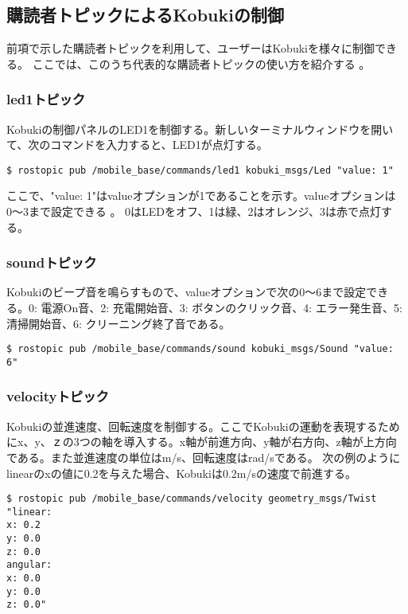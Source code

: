 \subsection{購読者トピックによるKobukiの制御}

前項で示した購読者トピックを利用して、ユーザーはKobukiを様々に制御できる。  ここでは、このうち代表的な購読者トピックの使い方を紹介する  。

\subsubsection{led1トピック}

Kobukiの制御パネルのLED1を制御する。新しいターミナルウィンドウを開いて、次のコマンドを入力すると、LED1が点灯する。

\begin{lstlisting}[language=ROS]
$ rostopic pub /mobile_base/commands/led1 kobuki_msgs/Led "value: 1"
\end{lstlisting}

ここで、"value: 1"はvalueオプションが1であることを示す。valueオプションは0〜3まで設定できる  。 0はLEDをオフ、1は緑、2はオレンジ、3は赤で点灯する。

\subsubsection{soundトピック}

Kobukiのビープ音を鳴らすもので、valueオプションで次の0〜6まで設定できる。0: 電源On音、2: 充電開始音、3: ボタンのクリック音、4: エラー発生音、5: 清掃開始音、6: クリーニング終了音である。

\begin{lstlisting}[language=ROS]
$ rostopic pub /mobile_base/commands/sound kobuki_msgs/Sound "value: 6"
\end{lstlisting}

\subsubsection{velocityトピック}

Kobukiの並進速度、回転速度を制御する。ここでKobukiの運動を表現するためにx、y、ｚの3つの軸を導入する。x軸が前進方向、y軸が右方向、z軸が上方向である。また並進速度の単位はm/s、回転速度はrad/sである。
次の例のようにlinearのxの値に0.2を与えた場合、Kobukiは0.2m/sの速度で前進する。

\begin{lstlisting}[language=ROS]
$ rostopic pub /mobile_base/commands/velocity geometry_msgs/Twist "linear:
x: 0.2
y: 0.0
z: 0.0
angular:
x: 0.0
y: 0.0
z: 0.0"
\end{lstlisting}


